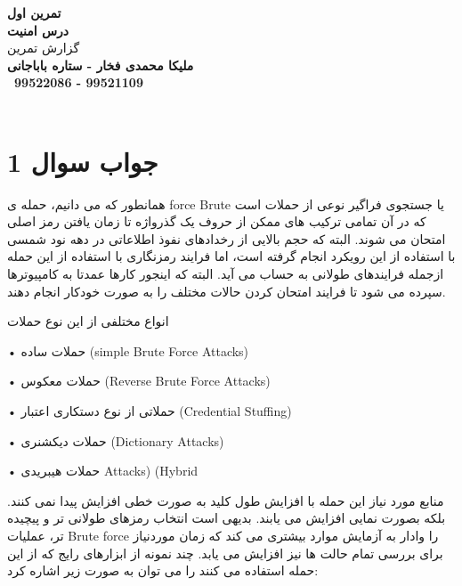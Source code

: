 \def \Subject {تمرین  اول}
\def \Course {درس امنیت}
\def \Author {ملیکا محمدی فخار - ستاره باباجانی}
\def \Report {گزارش تمرین}
\def \StudentNumber {99522086 - 99521109}



\begin{center}
\vspace{.4cm}
{\bf {\huge \Subject}}\\
\vspace{.6cm}
{\bf \Large \Course}\\
{\Large \Report} \\
\vspace{.3cm}
{\bf \Author }  \\
\vspace{.2cm}
{\bf \ \StudentNumber}\\\

\end{center}

\hspace{\fill} 

\clearpage



\section{جواب سوال 1}
همانطور که می دانیم، حمله ی force Brute یا جستجوی فراگیر نوعی از حملات است که در آن تمامی  ترکیب های ممکن از حروف یک گذرواژه تا زمان یافتن رمز اصلی امتحان می شوند. البته که حجم بالایی از رخدادهای نفوذ اطلاعاتی در دهه نود شمسی با استفاده از این رویکرد انجام گرفته است، اما فرایند رمزنگاری با استفاده از این حمله ازجمله فرایندهای طولانی به حساب می آید. البته که اینجور کارها عمدتا به کامپیوترها سپرده می شود تا فرایند امتحان کردن حالات مختلف را به صورت خودکار انجام دهند. 

انواع مختلفی از این نوع حملات 

•	حملات ساده (simple Brute Force Attacks) 

•	حملات معکوس (Reverse Brute Force Attacks)

•	حملاتی از نوع دستکاری اعتبار (Credential Stuffing)  

•	حملات دیکشنری (Dictionary Attacks)

•	حملات هیبریدی Attacks)   (Hybrid 

منابع مورد نیاز این حمله با افزایش طول کلید به صورت خطی افزایش پیدا نمی کنند. بلکه بصورت  نمایی افزایش می یابند. بدیهی است انتخاب رمزهای طولانی تر و پیچیده تر، عملیات Brute force را وادار به آزمایش موارد بیشتری می کند که زمان موردنیاز برای بررسی تمام حالت ها نیز افزایش می یابد. 
چند نمونه از ابزارهای رایج که از این حمله استفاده می کنند را می توان به صورت زیر اشاره کرد: 

